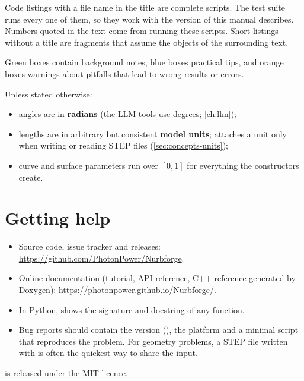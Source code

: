 Code listings with a file name in the title are complete scripts. The test suite runs every one
of them, so they work with the version of \NF{} this manual describes. Numbers quoted in the
text come from running these scripts. Short listings without a title are fragments that assume
the objects of the surrounding text.

\begin{note}[Boxes]
Green boxes contain background notes, blue boxes practical tips, and orange boxes warnings
about pitfalls that lead to wrong results or errors.
\end{note}

Unless stated otherwise:
\begin{itemize}
  \item angles are in \textbf{radians} (the LLM tools use degrees; \cref{ch:llm});
  \item lengths are in arbitrary but consistent \textbf{model units}; \NF{} attaches a unit only
    when writing or reading STEP files (\cref{sec:concepts-units});
  \item curve and surface parameters run over $[0,1]$ for everything the constructors create.
\end{itemize}

\section{Getting help}\label{sec:intro-help}

\begin{itemize}
  \item Source code, issue tracker and releases: \url{https://github.com/PhotonPower/Nurbforge}.
  \item Online documentation (tutorial, API reference, C++ reference generated by Doxygen):
    \url{https://photonpower.github.io/Nurbforge/}.
  \item In Python,  shows the signature and docstring of any function.
  \item Bug reports should contain the \NF{} version (), the platform and a
    minimal script that reproduces the problem. For geometry problems, a STEP file written with
     is often the quickest way to share the input.
\end{itemize}

\NF{} is released under the MIT licence.
